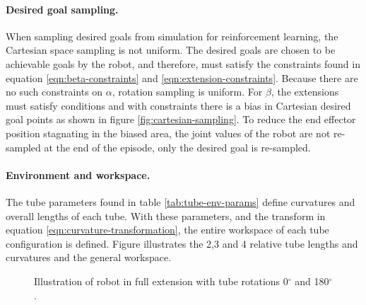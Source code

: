 \paragraph{Desired goal sampling.} When sampling desired goals from simulation for reinforcement learning, the Cartesian space sampling is not uniform. The desired goals are chosen to be achievable goals by the robot, and therefore, must satisfy the constraints found in equation \ref{eqn:beta-constraints} and \ref{eqn:extension-constraints}. Because there are no such constraints on $\alpha$, rotation sampling is uniform. For $\beta$, the extensions must satisfy conditions and with constraints there is a bias in Cartesian desired goal points as shown in figure \ref{fig:cartesian-sampling}. To reduce the end effector position stagnating in the biased area, the joint values of the robot are not re-sampled at the end of the episode, only the desired goal is re-sampled.

\paragraph{Environment and workspace.} The tube parameters found in table \ref{tab:tube-env-params} define curvatures and overall lengths of each tube. With these parameters, and the transform in equation \ref{eqn:curvature-transformation}, the entire workspace of each tube configuration is defined. Figure illustrates the 2,3 and 4 relative tube lengths and curvatures and the general workspace.

\begin{figure}
    \caption{Illustration of robot in full extension with tube rotations 0$^{\circ}$ and 180$^{\circ}$.}
    \label{fig:workspace}
\end{figure}

